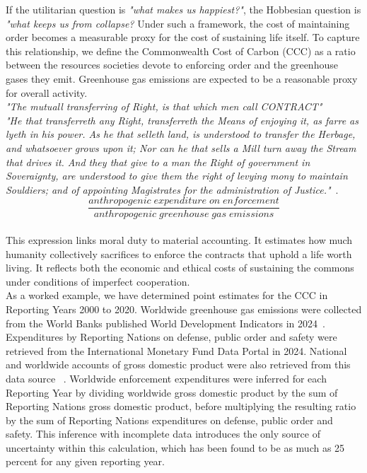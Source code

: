 \documentclass[10pt, oneside]{article}   	%
\begin{document}
If the utilitarian question is \emph{"what makes us happiest?"}, the Hobbesian question is \emph{"what keeps us from collapse?}
Under such a framework, the cost of maintaining order becomes a measurable proxy for the cost of sustaining life itself.
To capture this relationship, we define the Commonwealth Cost of Carbon (CCC) as a ratio between the resources societies devote to enforcing order and the greenhouse gases they emit.
Greenhouse gas emissions are expected to be a reasonable proxy for overall activity.\\

\emph{"The mutuall transferring of Right, is that which men call CONTRACT"}\\

\emph{"He that transferreth any Right, transferreth the Means of enjoying it, as farre as lyeth in his power.
As he that selleth land, is understood to transfer the Herbage, and whatsoever grows upon it; Nor can he that sells a Mill turn away the Stream that drives it.
And they that give to a man the Right of government in Soveraignty, are understood to give them the right of levying mony to maintain Souldiers; and of appointing Magistrates for the administration of Justice."}~\cite{th1}.\\

\begin{equation}
	\frac{anthropogenic\; expenditure\; on\; enforcement}{anthropogenic\; greenhouse\; gas\; emissions}
\end{equation}\\

This expression links moral duty to material accounting.
It estimates how much humanity collectively sacrifices to enforce the contracts that uphold a life worth living.
It reflects both the economic and ethical costs of sustaining the commons under conditions of imperfect cooperation.\\

As a worked example, we have determined point estimates for the CCC in Reporting Years 2000 to 2020.
Worldwide greenhouse gas emissions were collected from the World Banks published World Development Indicators in 2024~\cite{wbank}.
Expenditures by Reporting Nations on defense, public order and safety were retrieved from the International Monetary Fund Data Portal in 2024.
National and worldwide accounts of gross domestic product were also retrieved from this data source ~\cite{imf}.
Worldwide enforcement expenditures were inferred for each Reporting Year by dividing worldwide gross domestic product by the sum of Reporting Nations gross domestic product, before multiplying the resulting ratio by the sum of Reporting Nations expenditures on defense, public order and safety.
This inference with incomplete data introduces the only source of uncertainty within this calculation, which has been found to be as much as 25 percent for any given reporting year.\\
\end{document}
